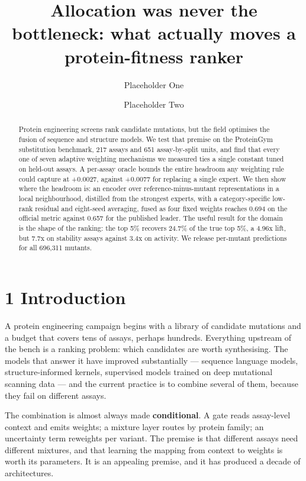 \documentclass[sigconf,review,nonacm]{acmart}
\begin{document}
\title{Allocation was never the bottleneck: what actually moves a protein-fitness ranker}
\author{Placeholder One}
\author{Placeholder Two}
\begin{abstract}
Protein engineering screens rank candidate mutations, but the field optimises the fusion of sequence and
structure models. We test that premise on the ProteinGym substitution benchmark, 217 assays and 651
assay-by-split units, and find that every one of seven adaptive weighting mechanisms we measured ties a
single constant tuned on held-out assays. A per-assay oracle bounds the entire headroom any weighting
rule could capture at +0.0027, against +0.0077 for replacing a single expert. We then show where the
headroom is: an encoder over reference-minus-mutant representations in a local neighbourhood, distilled
from the strongest experts, with a category-specific low-rank residual and eight-seed averaging, fused
as four fixed weights reaches 0.694 on the official metric against 0.657 for the published leader. The
useful result for the domain is the shape of the ranking: the top 5\% recovers 24.7\% of the true top
5\%, a 4.96x lift, but 7.7x on stability assays against 3.4x on activity. We release per-mutant
predictions for all 696,311 mutants.
\end{abstract}
\maketitle
\hypertarget{introduction}{%
\section{1 Introduction}\label{introduction}}

A protein engineering campaign begins with a library of candidate mutations and a budget that covers
tens of assays, perhaps hundreds. Everything upstream of the bench is a ranking problem: which
candidates are worth synthesising. The models that answer it have improved substantially --- sequence
language models, structure-informed kernels, supervised models trained on deep mutational scanning
data --- and the current practice is to combine several of them, because they fail on different assays.

The combination is almost always made \textbf{conditional}. A gate reads assay-level context and emits
weights; a mixture layer routes by protein family; an uncertainty term reweights per variant. The
premise is that different assays need different mixtures, and that learning the mapping from context to
weights is worth its parameters. It is an appealing premise, and it has produced a decade of
architectures.
\end{document}
